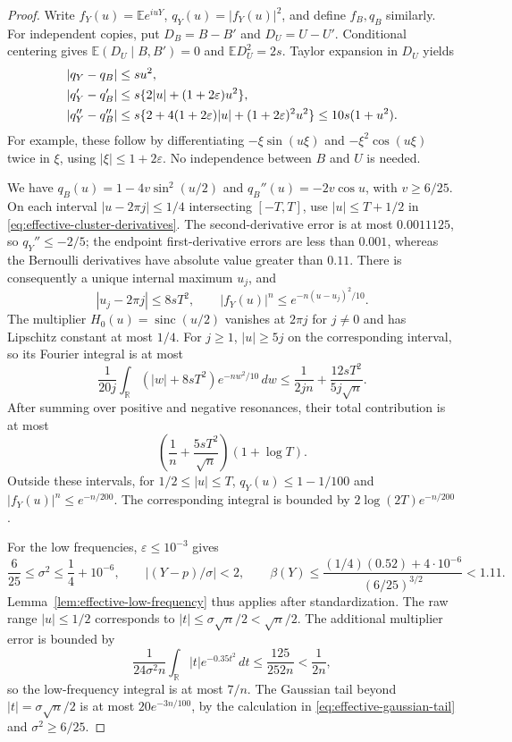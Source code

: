 \documentclass[aop]{imsart}
\theoremstyle{plain}
\theoremstyle{definition}
\theoremstyle{definition}
\newcommand{\EE}{\mathbb E}
\newcommand{\R}{\mathbb R}
\DeclareMathOperator{\sinc}{sinc}
\begin{document}
\begin{proof}
Write $f_Y(u)=\EE e^{iuY}$, $q_Y(u)=|f_Y(u)|^2$, and
define $f_B,q_B$ similarly.
For independent copies, put $D_B=B-B'$ and $D_U=U-U'$.
Conditional centering gives $\EE(D_U\mid B,B')=0$ and
$\EE D_U^2=2s$.  Taylor expansion in $D_U$ yields
\begin{align}
 |q_Y-q_B|&\le su^2,\notag\\
 |q_Y'-q_B'|&\le s\{2|u|+(1+2\varepsilon)u^2\},\notag\\
 |q_Y''-q_B''|&\le s\{2+4(1+2\varepsilon)|u|
                       +(1+2\varepsilon)^2u^2\}
 \le10s(1+u^2).\label{eq:effective-cluster-derivatives}
\end{align}
For example, these follow by differentiating $-\xi\sin(u\xi)$ and
$-\xi^2\cos(u\xi)$ twice in $\xi$, using $|\xi|\le1+2\varepsilon$.
No independence between $B$ and $U$ is needed.

We have $q_B(u)=1-4v\sin^2(u/2)$ and $q_B''(u)=-2v\cos u$,
with $v\ge6/25$.  On each interval
$|u-2\pi j|\le1/4$ intersecting $[-T,T]$, use
$|u|\le T+1/2$ in \eqref{eq:effective-cluster-derivatives}.
The second-derivative error is at most $0.0011125$, so $q_Y''\le-2/5$;
the endpoint first-derivative errors are less than $0.001$, whereas
the Bernoulli derivatives have absolute value greater than $0.11$.
There is consequently a unique internal maximum $u_j$, and
\[
 |u_j-2\pi j|\le8sT^2,\qquad
 |f_Y(u)|^n\le e^{-n(u-u_j)^2/10}.
\]
The multiplier $H_0(u)=\sinc(u/2)$ vanishes at $2\pi j$ for
$j\ne0$ and has Lipschitz constant at most $1/4$.
For $j\ge1$, $|u|\ge5j$ on the corresponding interval, so its
Fourier integral is at most
\[
 \frac1{20j}\int_{\R}(|w|+8sT^2)e^{-nw^2/10}\,dw
 \le\frac1{2jn}+\frac{12sT^2}{5j\sqrt n}.
\]
After summing over positive and negative resonances, their total
contribution is at most
\begin{equation}\label{eq:effective-cluster-resonances}
 \left(\frac1n+\frac{5sT^2}{\sqrt n}\right)(1+\log T).
\end{equation}
Outside these intervals, for $1/2\le|u|\le T$,
$q_Y(u)\le1-1/100$ and $|f_Y(u)|^n\le e^{-n/200}$.
The corresponding integral is bounded by $2\log(2T)e^{-n/200}$.

For the low frequencies, $\varepsilon\le10^{-3}$ gives
\[
 \frac6{25}\le\sigma^2\le\frac14+10^{-6},\qquad
 |(Y-p)/\sigma|<2,\qquad
 \beta(Y)\le\frac{(1/4)(0.52)+4\cdot10^{-6}}{(6/25)^{3/2}}<1.11.
\]
Lemma~\ref{lem:effective-low-frequency} thus applies after standardization.
The raw range $|u|\le1/2$ corresponds to
$|t|\le\sigma\sqrt n/2<\sqrt n/2$.
The additional multiplier error is bounded by
\[
 \frac1{24\sigma^2n}\int_{\R}|t|e^{-0.35t^2}\,dt
 \le\frac{125}{252n}<\frac1{2n},
\]
so the low-frequency integral is at most $7/n$.
The Gaussian tail beyond $|t|=\sigma\sqrt n/2$ is at most
$20e^{-3n/100}$, by the calculation in
\eqref{eq:effective-gaussian-tail} and $\sigma^2\ge6/25$.


\end{proof}
\end{document}
